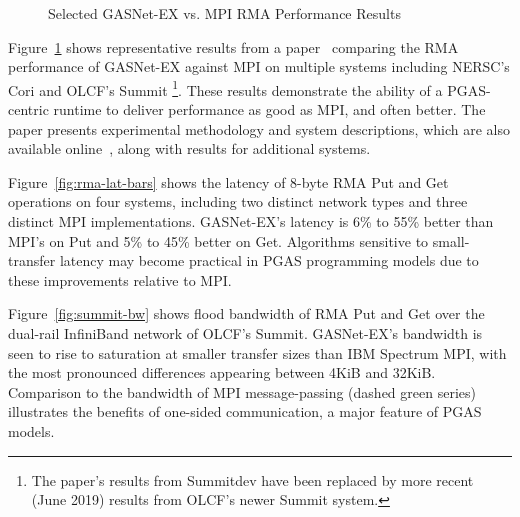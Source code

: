 \begin{figure}[htb]
  \centering
  \caption{\label{fig:gasnet-ex-rma} Selected GASNet-EX vs. MPI RMA Performance Results}
\end{figure}

Figure~\ref{fig:gasnet-ex-rma} shows representative results from a
paper~\cite{gasnet-lcpc18} comparing
the RMA performance of GASNet-EX against MPI on multiple systems including
NERSC's Cori and OLCF's Summit%
\footnote{The paper's results from Summitdev
have been replaced by more recent (June 2019) results from OLCF's newer Summit system.}.
These results demonstrate the ability of a PGAS-centric runtime to
deliver performance as good as MPI, and often better.
%
The paper presents experimental methodology and system descriptions, which are
also available online~\cite{gasnet-site}, along with results for additional
systems.

Figure~\ref{fig:rma-lat-bars} shows the latency of 8-byte RMA Put and Get operations on
four systems, including two distinct network types and three distinct MPI
implementations.
%
GASNet-EX's latency is 6\% to 55\% better than MPI's on Put and 5\% to 45\%
better on Get.
%
Algorithms sensitive to small-transfer latency may become practical in PGAS
programming models due to these improvements relative to MPI.

Figure~\ref{fig:summit-bw} shows flood bandwidth of RMA Put and Get over the
dual-rail InfiniBand network of OLCF's Summit.
GASNet-EX's bandwidth is seen to rise to saturation at smaller
transfer sizes than IBM Spectrum MPI, with the most pronounced differences
appearing between 4KiB and 32KiB.
%
Comparison to the bandwidth of MPI message-passing (dashed green series) illustrates the
benefits of one-sided communication, a major feature of PGAS models.


